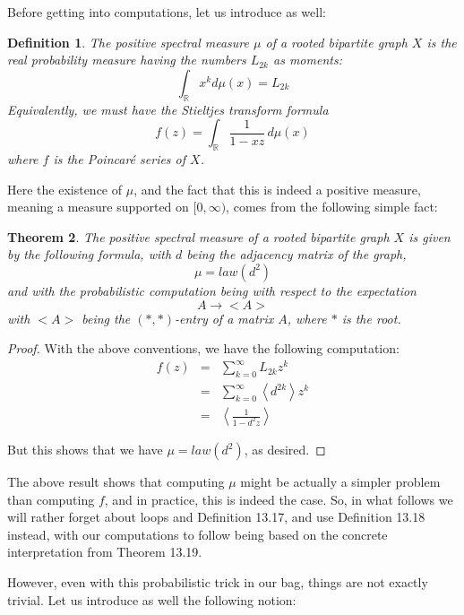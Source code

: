 \documentclass[12pt]{amsbook}
\newtheorem{theorem}{Theorem}[chapter]
\newtheorem{definition}[theorem]{Definition}
\begin{document}
\bigskip

Before getting into computations, let us introduce as well:

\begin{definition}
The positive spectral measure $\mu$ of a rooted bipartite graph $X$ is the real probability measure having the numbers $L_{2k}$ as moments:
$$\int_\mathbb Rx^kd\mu(x)=L_{2k}$$
Equivalently, we must have the Stieltjes transform formula
$$f(z)=\int_\mathbb R\frac{1}{1-xz}\,d\mu(x)$$
where $f$ is the Poincar\'e series of $X$.
\end{definition}

Here the existence of $\mu$, and the fact that this is indeed a positive measure, meaning a measure supported on $[0,\infty)$, comes from the following simple fact:

\begin{theorem}
The positive spectral measure of a rooted bipartite graph $X$ is given by the following formula, with $d$ being the adjacency matrix of the graph,
$$\mu=law(d^2)$$
and with the probabilistic computation being with respect to the expectation 
$$A\to<A>$$
with $<A>$ being the $(*,*)$-entry of a matrix $A$, where $*$ is the root.
\end{theorem}

\begin{proof}
With the above conventions, we have the following computation:
\begin{eqnarray*}
f(z)
&=&\sum_{k=0}^\infty L_{2k}z^k\\
&=&\sum_{k=0}^\infty\left<d^{2k}\right>z^k\\
&=&\left<\frac{1}{1-d^2z}\right>
\end{eqnarray*}

But this shows that we have $\mu=law(d^2)$, as desired.
\end{proof}

The above result shows that computing $\mu$ might be actually a simpler problem than computing $f$, and in practice, this is indeed the case. So, in what follows we will rather forget about loops and Definition 13.17, and use Definition 13.18 instead, with our computations to follow being based on the concrete interpretation from Theorem 13.19.

\bigskip

However, even with this probabilistic trick in our bag, things are not exactly trivial. Let us introduce as well the following notion:

\end{document}
